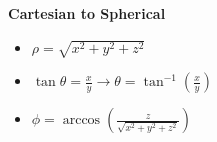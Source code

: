 \documentclass[10pt]{article}                               %
\begin{document}
\begin{defaultbox}
\begin{adjustwidth}{2em}{0pt}
\begin{adjustwidth}{2em}{0pt}
                \vspace{0.5em}

                \textbf{Cartesian to Spherical}

                \begin{itemize}
                    \item \( \rho = \sqrt{x^2 + y^2 + z^2} \)
                    \item \( \tan\theta = \frac{x}{y}  \rightarrow  \theta = \tan^{-1}\left(\frac{x}{y}\right) \)
                    \item \( \phi = \arccos\left(\frac{z}{\sqrt{x^2 + y^2 + z^2}}\right) \)
                \end{itemize}

        \end{adjustwidth}

    \end{adjustwidth}

\end{defaultbox}
\end{document}
